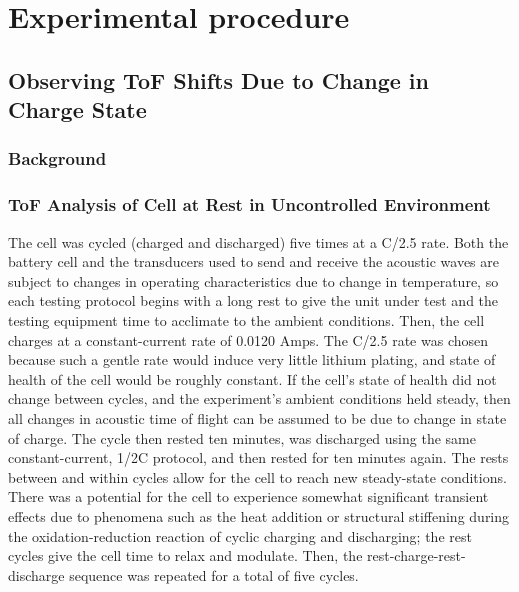 
\chapter{Experimental procedure}

\section{Observing ToF Shifts Due to Change in Charge State}

\subsection{Background}

\subsection{ToF Analysis of Cell at Rest in Uncontrolled Environment}

The cell was cycled (charged and discharged) five times at a C/2.5 rate. Both the battery cell and the transducers used to send and receive the acoustic waves are subject to changes in operating characteristics due to change in temperature, so each testing protocol begins with a long rest to give the unit under test and the testing equipment time to acclimate to the ambient conditions. Then, the cell charges at a constant-current rate of 0.0120 Amps. 
The C/2.5 rate was chosen because such a gentle rate would induce very little lithium plating, and state of health of the cell would be roughly constant. 
If the cell's state of health did not change between cycles, and the experiment's ambient conditions held steady, then all changes in acoustic time of flight can be assumed to be due to change in state of charge.
The cycle then rested ten minutes, was discharged using the same constant-current, 1/2C protocol, and then rested for ten minutes again. 
The rests between and within cycles allow for the cell to reach new steady-state conditions. 
There was a potential for the cell to experience somewhat significant transient effects due to phenomena such as the heat addition or structural stiffening during the oxidation-reduction reaction of cyclic charging and discharging; the rest cycles give the cell time to relax and modulate.
Then, the rest-charge-rest-discharge sequence was repeated for a total of five cycles.



